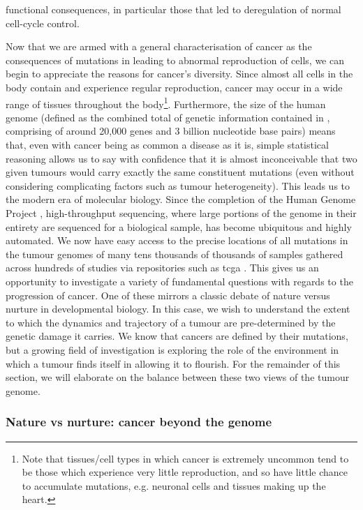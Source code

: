 \documentclass[thesis.tex]{subfiles}
\begin{document}
functional consequences, in particular those that led to deregulation of normal cell-cycle control.

Now that we are armed with a general characterisation of cancer as the consequences of mutations in  leading to abnormal reproduction of cells, we can begin to appreciate the reasons for cancer's diversity. Since almost all cells in the body contain  and experience regular reproduction, cancer may occur in a wide range of tissues throughout the body\footnote{Note that tissues/cell types in which cancer is extremely uncommon tend to be those which experience very little reproduction, and so have little chance to accumulate mutations, e.g. neuronal cells and tissues making up the heart.}. Furthermore, the size of the human genome (defined as the combined total of genetic information contained in , comprising of around 20,000 genes and 3 billion nucleotide base pairs) means that, even with cancer being as common a disease as it is, simple statistical reasoning allows us to say with confidence that it is almost inconceivable that two given tumours would carry exactly the same constituent mutations (even without considering complicating factors such as tumour heterogeneity). This leads us to the modern era of molecular biology. Since the completion of the Human Genome Project \citep{lander_initial_2001}, high-throughput sequencing, where large portions of the genome in their entirety are sequenced for a biological sample, has become ubiquitous and highly automated. We now have easy access to the precise locations of all mutations in the tumour genomes of many tens thousands of thousands of samples gathered across hundreds of studies via repositories such as \gls{tcga} \citep{weinstein_cancer_2013}. This gives us an opportunity to investigate a variety of fundamental questions with regards to the progression of cancer. One of these mirrors a classic debate of nature versus nurture in developmental biology. In this case, we wish to understand the extent to which the dynamics and trajectory of a tumour are pre-determined by the genetic damage it carries. We know that cancers are defined by their mutations, but a growing field of investigation is exploring the role of the environment in which a tumour finds itself in allowing it to flourish. For the remainder of this section, we will elaborate on the balance between these two views of the tumour genome.

\subsubsection{Nature vs nurture: cancer beyond the genome}
\end{document}
